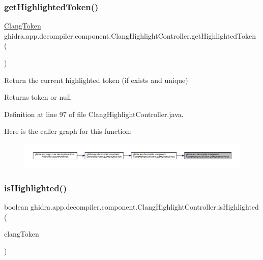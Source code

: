 \subsubsection{\texorpdfstring{getHighlightedToken()}{getHighlightedToken()}}
{\footnotesize\ttfamily \mbox{\hyperlink{classghidra_1_1app_1_1decompiler_1_1_clang_token}{Clang\+Token}} ghidra.\+app.\+decompiler.\+component.\+Clang\+Highlight\+Controller.\+get\+Highlighted\+Token (\begin{DoxyParamCaption}{ }\end{DoxyParamCaption})\hspace{0.3cm}{\ttfamily [inline]}}

Return the current highlighted token (if exists and unique) \begin{DoxyReturn}{Returns}
token or null 
\end{DoxyReturn}


Definition at line 97 of file Clang\+Highlight\+Controller.\+java.

Here is the caller graph for this function\+:
\nopagebreak
\begin{figure}[H]
\begin{center}
\leavevmode
\includegraphics[width=350pt]{classghidra_1_1app_1_1decompiler_1_1component_1_1_clang_highlight_controller_ad3cddab4e55065b1704d6ecd191a553f_icgraph}
\end{center}
\end{figure}
\mbox{\label{classghidra_1_1app_1_1decompiler_1_1component_1_1_clang_highlight_controller_ae14a72d11ebc6ca440c68fe3ade4bb8d}} 
\subsubsection{\texorpdfstring{isHighlighted()}{isHighlighted()}}
{\footnotesize\ttfamily boolean ghidra.\+app.\+decompiler.\+component.\+Clang\+Highlight\+Controller.\+is\+Highlighted (\begin{DoxyParamCaption}\item[{\mbox{\hyperlink{classghidra_1_1app_1_1decompiler_1_1_clang_token}{Clang\+Token}}}]{clang\+Token }\end{DoxyParamCaption})\hspace{0.3cm}{\ttfamily [inline]}}



